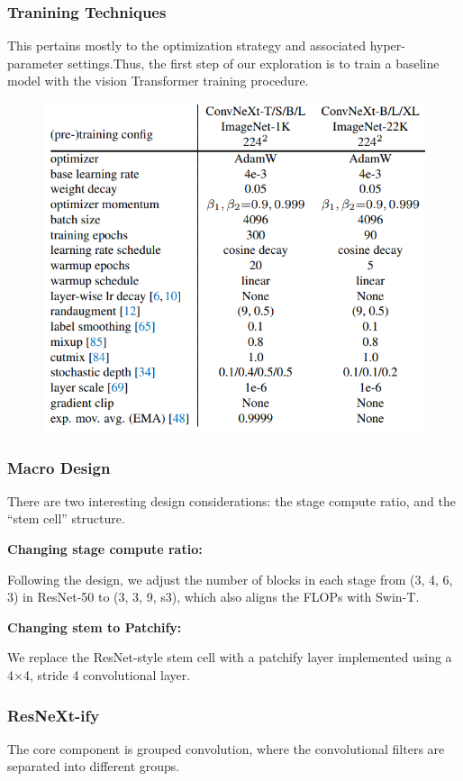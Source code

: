 \documentclass[11pt]{article}
\begin{document}
\subsubsection{Tranining Techniques}
This pertains mostly to the optimization strategy and associated hyper-parameter settings.Thus, the first step of our exploration is to train a baseline model with the vision Transformer training procedure.

\begin{figure}[H]
	\centering
	\includegraphics[scale=0.5]{43}
\end{figure}
\subsubsection{Macro Design}
There are two interesting design considerations: the stage compute ratio, and the “stem cell” structure.

\textbf{Changing stage compute ratio:}

Following the design, we adjust the number of blocks in each stage from (3, 4, 6, 3) in ResNet-50 to (3, 3, 9, s3), which also aligns the FLOPs with Swin-T.

\textbf{Changing stem to Patchify:}

We replace the ResNet-style stem cell with a patchify layer implemented using a 4×4, stride 4 convolutional layer.
\subsubsection{ResNeXt-ify}
The core component is grouped convolution, where the convolutional filters are separated into different groups.
\end{document}
